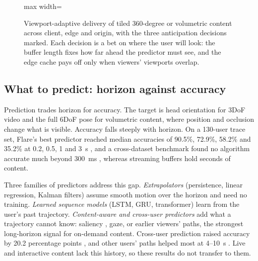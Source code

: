 \begin{figure}[t]
\begin{adjustbox}{max width=\linewidth}
\end{adjustbox}
\caption{Viewport-adaptive delivery of tiled 360-degree or volumetric content across client, edge and origin, with the three anticipation decisions marked. Each decision is a bet on where the user will look: the buffer length fixes how far ahead the predictor must see, and the edge cache pays off only when viewers' viewports overlap.}
\label{fig:anticipate-arch}
\end{figure}

\subsection{What to predict: horizon against accuracy}

Prediction trades horizon for accuracy. The target is head orientation for 3DoF video and the full 6DoF pose for volumetric content, where position and occlusion change what is visible. Accuracy falls steeply with horizon. On a 130-user trace set, Flare's best predictor reached median accuracies of 90.5\%, 72.9\%, 58.2\% and 35.2\% at 0.2, 0.5, 1 and 3~s \cite{W2896840651}, and a cross-dataset benchmark found no algorithm accurate much beyond 300~ms \cite{W3089527252}, whereas streaming buffers hold seconds of content.

Three families of predictors address this gap. \emph{Extrapolators} (persistence, linear regression, Kalman filters) assume smooth motion over the horizon and need no training. \emph{Learned sequence models} (LSTM, GRU, transformer) learn from the user's past trajectory. \emph{Content-aware and cross-user predictors} add what a trajectory cannot know: saliency \cite{W2624991012}, gaze, or earlier viewers' paths, the strongest long-horizon signal for on-demand content. Cross-user prediction raised accuracy by 20.2 percentage points \cite{W2896449077}, and other users' paths helped most at 4--10~s \cite{W2963428739}. Live and interactive content lack this history, so these results do not transfer to them.

